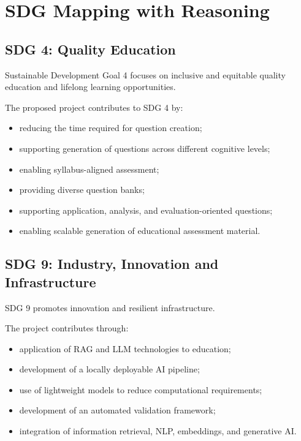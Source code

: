 \documentclass[12pt,a4paper]{report}
\begin{document}

\chapter{SDG Mapping with Reasoning}

\section{SDG 4: Quality Education}

Sustainable Development Goal 4 focuses on inclusive and equitable quality education and lifelong learning opportunities.

The proposed project contributes to SDG 4 by:

\begin{itemize}
    \item reducing the time required for question creation;
    \item supporting generation of questions across different cognitive levels;
    \item enabling syllabus-aligned assessment;
    \item providing diverse question banks;
    \item supporting application, analysis, and evaluation-oriented questions;
    \item enabling scalable generation of educational assessment material.
\end{itemize}

\section{SDG 9: Industry, Innovation and Infrastructure}

SDG 9 promotes innovation and resilient infrastructure.

The project contributes through:

\begin{itemize}
    \item application of RAG and LLM technologies to education;
    \item development of a locally deployable AI pipeline;
    \item use of lightweight models to reduce computational requirements;
    \item development of an automated validation framework;
    \item integration of information retrieval, NLP, embeddings, and generative AI.
\end{itemize}
\end{document}

